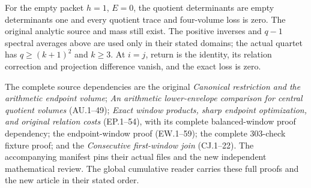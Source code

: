 \documentclass[11pt]{article}
\begin{document}
For the empty packet $h=1$, $E=0$, the quotient determinants are
empty determinants one and every quotient trace and four-volume loss
is zero. The original analytic source and mass still exist. The
positive inverses and $q-1$ spectral averages above are used only
in their stated domains; the actual quartet has $q\ge(k+1)^2$
and $k\ge3$. At $i=j$, return is the identity, its relation correction
and projection difference vanish, and the exact loss is zero.

The complete source dependencies are the original
\emph{Canonical restriction and the arithmetic endpoint volume};
\emph{An arithmetic lower-envelope comparison for central quotient
volumes} (AU.1--49); \emph{Exact window products, sharp endpoint
optimization, and original relation costs} (EP.1--54), with its
complete balanced-window proof dependency; the endpoint-window proof
(EW.1--59); the complete 303-check fixture proof; and the
\emph{Consecutive first-window join} (CJ.1--22).
The accompanying manifest pins their actual files and the new
independent mathematical review. The global cumulative reader carries
these full proofs and the new article in their stated order.
\end{document}
